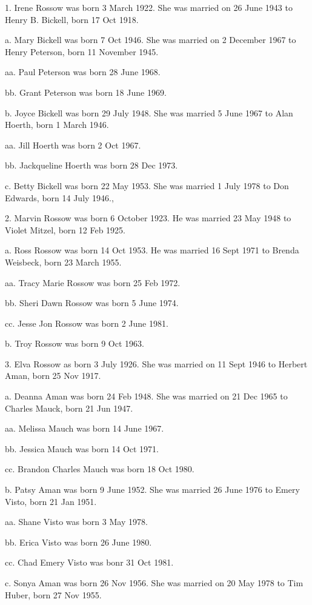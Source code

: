 \documentclass[a4paper]{article}
\begin{document}
1. Irene Rossow was born 3 March 1922.  She was married on 26 June 1943 to Henry B. Bickell, born 17 Oct 1918.
 
a. Mary Bickell was born 7 Oct 1946.  She was married on 2 December 1967 to Henry Peterson, born 11 November 1945.
 
aa. Paul Peterson was born 28 June 1968.

bb. Grant Peterson was born 18 June 1969.

b. Joyce Bickell was born 29 July 1948.  She was married 5 June 1967 to Alan Hoerth, born 1 March 1946.
 
aa. Jill Hoerth was born 2 Oct 1967.

bb. Jackqueline Hoerth was born 28 Dec 1973.

c. Betty Bickell was born 22 May 1953.  She was married 1 July 1978 to Don Edwards, born 14 July 1946.,
 
2. Marvin Rossow was born 6 October 1923.  He was married 23 May 1948 to Violet Mitzel, born 12 Feb 1925.
 
a. Ross Rossow was born 14 Oct 1953.  He was married 16 Sept 1971 to Brenda Weisbeck, born 23 March 1955.
 
aa. Tracy Marie Rossow was born 25 Feb 1972.
 
bb. Sheri Dawn Rossow was born 5 June 1974.

cc. Jesse Jon Rossow was born 2 June 1981.

b. Troy Rossow was born 9 Oct 1963.

3. Elva Rossow as born 3 July 1926.  She was married on 11 Sept 1946 to Herbert Aman, born 25 Nov 1917.
 
a. Deanna Aman was born 24 Feb 1948.  She was married on 21 Dec 1965 to Charles Mauck, born 21 Jun 1947.  
 
aa. Melissa Mauch was born 14 June 1967.

bb. Jessica Mauch was born 14 Oct 1971.

cc. Brandon Charles Mauch was born 18 Oct 1980.

b. Patsy Aman was born 9 June 1952.  She was married 26 June 1976 to Emery Visto, born 21 Jan 1951.
 
aa. Shane Visto was born 3 May 1978.

bb. Erica Visto was born 26 June 1980.

cc. Chad Emery Visto was bonr 31 Oct 1981.

c. Sonya Aman was born 26 Nov 1956.  She was married on 20 May 1978 to Tim Huber, born 27 Nov 1955.
 
\end{document}
